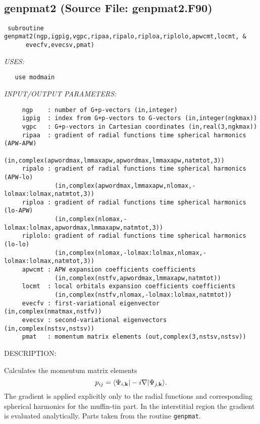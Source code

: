 \documentclass[11pt]{article}
\begin{document}



 
 
\mbox{}\hrulefill\ 
 
\subsection{genpmat2 (Source File: genpmat2.F90)}


\begin{verbatim} subroutine genpmat2(ngp,igpig,vgpc,ripaa,ripalo,riploa,riplolo,apwcmt,locmt, &
      evecfv,evecsv,pmat)\end{verbatim}{\em USES:}
\begin{verbatim}   use modmain\end{verbatim}{\em INPUT/OUTPUT PARAMETERS:}
\begin{verbatim}     ngp    : number of G+p-vectors (in,integer)
     igpig  : index from G+p-vectors to G-vectors (in,integer(ngkmax))
     vgpc   : G+p-vectors in Cartesian coordinates (in,real(3,ngkmax))
     ripaa  : gradient of radial functions time spherical harmonics (APW-APW)
              (in,complex(apwordmax,lmmaxapw,apwordmax,lmmaxapw,natmtot,3))
     ripalo : gradient of radial functions time spherical harmonics (APW-lo)
              (in,complex(apwordmax,lmmaxapw,nlomax,-lolmax:lolmax,natmtot,3))
     riploa : gradient of radial functions time spherical harmonics (lo-APW)
              (in,complex(nlomax,-lolmax:lolmax,apwordmax,lmmaxapw,natmtot,3))
     riplolo: gradient of radial functions time spherical harmonics (lo-lo)
              (in,complex(nlomax,-lolmax:lolmax,nlomax,-lolmax:lolmax,natmtot,3))
     apwcmt : APW expansion coefficients coefficients
              (in,complex(nstfv,apwordmax,lmmaxapw,natmtot))
     locmt  : local orbitals expansion coefficients coefficients
              (in,complex(nstfv,nlomax,-lolmax:lolmax,natmtot))
     evecfv : first-variational eigenvector (in,complex(nmatmax,nstfv))
     evecsv : second-variational eigenvectors (in,complex(nstsv,nstsv))
     pmat   : momentum matrix elements (out,complex(3,nstsv,nstsv))\end{verbatim}
{\sf DESCRIPTION:\\ }


     Calculates the momentum matrix elements
     $$ p_{ij}=\langle\Psi_{i,{\bf k}}|-i\nabla|\Psi_{j,{\bf k}}\rangle. $$
     The gradient is applied explicitly only to the radial functions and 
     corresponding spherical harmonics for the muffin-tin part. In the 
     interstitial region the gradient is evaluated analytically.
     Parts taken from the routine {\tt genpmat}.
  
\end{document}
